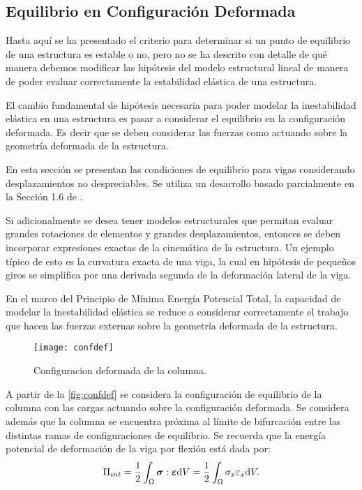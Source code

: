 
\subsection{Equilibrio en Configuración Deformada}

Hasta aquí se ha presentado el criterio para determinar si un punto de equilibrio de una estructura es estable o no, pero no se ha descrito con detalle de qué manera debemos modificar las hipótesis del modelo estructural lineal de manera de poder evaluar correctamente la estabilidad elástica de una estructura.

El cambio fundamental de hipótesis necesaria para poder modelar la inestabilidad elástica en una estructura es pasar a considerar el equilibrio en la configuración deformada. Es decir que se deben considerar las fuerzas como actuando sobre la geometría deformada de la estructura.

En esta sección se presentan las condiciones de equilibrio para vigas considerando desplazamientos no despreciables. Se utiliza un desarrollo basado parcialmente en la Sección 1.6 de \citep{yoo2011}.

Si adicionalmente se desea tener modelos estructurales que permitan evaluar grandes rotaciones de elementos y grandes desplazamientos, entonces se deben incorporar expresiones exactas de la cinemática de la estructura. Un ejemplo típico de esto es la curvatura exacta de una viga, la cual en hipótesis de pequeños giros se simplifica por una derivada segunda de la deformación lateral de la viga.

En el marco del Principio de Mínima Energía Potencial Total, la capacidad de modelar la inestabilidad elástica se reduce a considerar correctamente el trabajo que hacen las fuerzas externas sobre la geometría deformada de la estructura.


\begin{figure}[htb]
	\centering
	\texttt{[image: confdef]}
	\caption{Configuracion deformada de la columna.}
	\label{fig:confdef}
\end{figure}

A partir de la \autoref{fig:confdef} se considera la configuración de equilibrio de la columna con las cargas actuando sobre la configuración deformada. Se considera además que la columna se encuentra próxima al límite de bifurcación entre las distintas ramas de configuraciones de equilibrio.
Se recuerda que la energía potencial de deformación de la viga por flexión está dada por:
%
\begin{equation}
\Pi_{int} = \frac{1}{2} \int_\Omega \boldsymbol{\sigma} : \boldsymbol{\varepsilon}  {\text{d}} V  = \frac{1}{2} \int_\Omega \sigma_x \varepsilon_x  {\text{d}} V. 
\end{equation}

